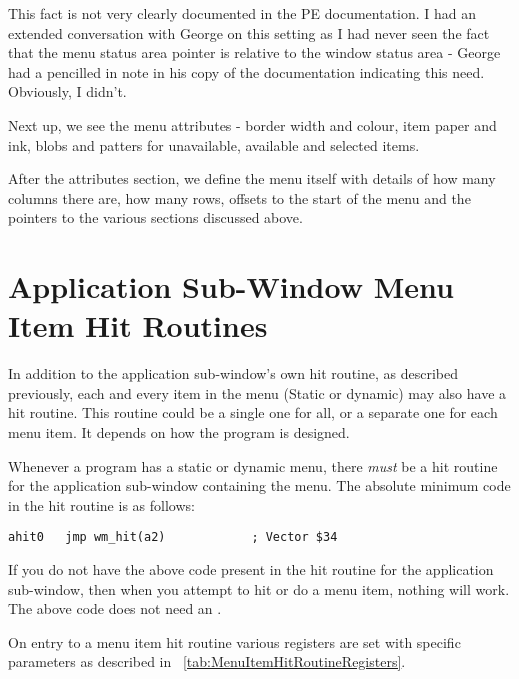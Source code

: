 \begin{note}
This fact is not very clearly documented in the PE documentation.
      I had an extended conversation with George on this setting as I had
      never seen the fact that the menu status area pointer is relative to the
      window status area -{} George had a pencilled in note in his copy of the
      documentation indicating this need. Obviously, I didn't.
\end{note}

Next up, we see the menu attributes -{} border width and colour, item
    paper and ink, blobs and patters for unavailable, available and selected
    items.

After the attributes section, we define the menu itself with details
    of how many columns there are, how many rows, offsets to the start of the
    menu and the pointers to the various sections discussed above.

\section{Application Sub-{}Window Menu Item Hit Routines}
\label{ch29-app-menu-item-hit}%

In addition to the application sub-{}window's own hit routine, as
    described previously, each and every item in the menu (Static or dynamic)
    may also have a hit routine. This routine could be a single one for all,
    or a separate one for each menu item. It depends on how the program is
    designed.

\begin{note}
Whenever a program has a static or dynamic menu, there
 \emph{must} be a hit routine for the application
      sub-{}window containing the menu. The absolute minimum code in the hit
      routine is as follows:

\begin{lstlisting}[firstnumber=1,caption={AppMenuTest1Win\_asm - Application Window Hit Routine}]
ahit0   jmp wm_hit(a2)            ; Vector $34
\end{lstlisting}

If you do not have the above code present in the hit routine for
      the application sub-{}window, then when you attempt to hit or do a menu
      item, nothing will work. The above code does not need an .
\end{note}

On entry to a menu item hit routine various registers are set with
    specific parameters as described in \tablename~\ref{tab:MenuItemHitRoutineRegisters}.


